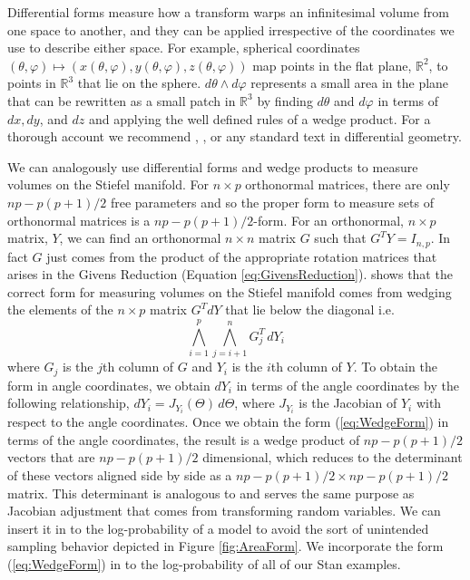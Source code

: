 \documentclass{article}
\begin{document}
Differential forms measure how a transform warps an infinitesimal volume from one space to another, and they can be applied irrespective of the coordinates we use to describe either space. For example, spherical coordinates $(\theta, \varphi) \mapsto (x(\theta,\varphi), y(\theta,\varphi), z(\theta,\varphi))$ map points in the flat plane, $\mathbb{R}^2$, to points in $\mathbb{R}^3$ that lie on the sphere. $d\theta \wedge d\varphi$ represents a small area in the plane that can be rewritten as a small patch in $\mathbb{R}^3$ by finding $d\theta$ and $d\varphi$ in terms of $dx, dy$, and $dz$ and applying the well defined rules of a wedge product. For a thorough account we recommend \citet{muirhead2009aspects}, \citet{edelman200518}, or any standard text in differential geometry.

We can analogously use differential forms and wedge products to measure volumes on the Stiefel manifold. For $n \times p$ orthonormal matrices, there are only $np-p(p+1)/2$ free parameters and so the proper form to measure sets of orthonormal matrices is a $np-p(p+1)/2$-form. For an orthonormal, $n \times p$ matrix, $Y$, we can find an orthonormal $n \times n$ matrix $G$ such that $G^T Y = I_{n,p}$. In fact $G$ just comes from the product of the appropriate rotation matrices that arises in the Givens Reduction (Equation \ref{eq:GivensReduction}). \citet{muirhead2009aspects} shows that the correct form for measuring volumes on the Stiefel manifold comes from wedging the elements of the $n \times p$ matrix $G^T dY$ that lie below the diagonal i.e.
\begin{equation}
\label{eq:WedgeForm}
\bigwedge_{i=1}^p \bigwedge_{j=i+1}^n G_j^T\, dY_i
\end{equation}
where $G_j$ is the $j$th column of $G$ and $Y_i$ is the $i$th column of $Y$. To obtain the form in angle coordinates, we obtain $dY_i$ in terms of the angle coordinates by the following relationship, $dY_i = J_{Y_i}(\Theta)\, d\Theta$, where $J_{Y_i}$ is the Jacobian of $Y_i$ with respect to the angle coordinates. Once we obtain the form (\ref{eq:WedgeForm}) in terms of the angle coordinates, the result is a wedge product of $np-p(p+1)/2$ vectors that are $np-p(p+1)/2$ dimensional, which reduces to the determinant of these vectors aligned side by side as a $np-p(p+1)/2 \times np-p(p+1)/2$ matrix. This determinant is analogous to and serves the same purpose as Jacobian adjustment that comes from transforming random variables. We can insert it in to the log-probability of a model to avoid the sort of unintended sampling behavior depicted in Figure \ref{fig:AreaForm}. We incorporate the form (\ref{eq:WedgeForm}) in to the log-probability of all of our Stan examples.
\end{document}
